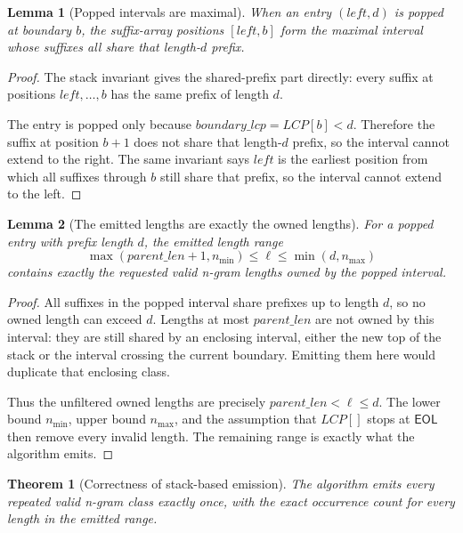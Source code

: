 \documentclass[11pt]{article}
\newtheorem{theorem}{Theorem}
\newtheorem{lemma}{Lemma}
\begin{document}
\begin{lemma}[Popped intervals are maximal]
When an entry \((\mathit{left},d)\) is popped at boundary \(b\), the
suffix-array positions \([\mathit{left},b]\) form the maximal interval whose
suffixes all share that length-\(d\) prefix.
\end{lemma}

\begin{proof}
The stack invariant gives the shared-prefix part directly: every suffix at
positions \(\mathit{left},\ldots,b\) has the same prefix of length \(d\).

The entry is popped only because \(\mathit{boundary\_lcp}=\mathit{LCP}[b]<d\).
Therefore the suffix at position \(b+1\) does not share that length-\(d\) prefix, so the
interval cannot extend to the right.  The same invariant says
\(\mathit{left}\) is the earliest position from which all suffixes through
\(b\) still share that prefix, so the interval cannot extend to the left.
\end{proof}

\begin{lemma}[The emitted lengths are exactly the owned lengths]
For a popped entry with prefix length \(d\), the emitted length range
\[
\max(\mathit{parent\_len}+1,n_{\min})\leq \ell\leq
\min(d,n_{\max})
\]
contains exactly the requested valid n-gram lengths owned by the popped
interval.
\end{lemma}

\begin{proof}
All suffixes in the popped interval share prefixes up to length \(d\), so no
owned length can exceed \(d\).  Lengths at most \(\mathit{parent\_len}\) are not owned
by this interval: they are still shared by an enclosing interval, either the new
top of the stack or the interval crossing the current boundary.  Emitting them
here would duplicate that enclosing class.

Thus the unfiltered owned lengths are precisely
\(\mathit{parent\_len}<\ell\leq d\).  The lower bound \(n_{\min}\), upper bound
\(n_{\max}\), and the assumption that \(\mathit{LCP}[]\) stops at
\(\mathsf{EOL}\) then remove every invalid length.  The remaining range is
exactly what the algorithm emits.
\end{proof}

\begin{theorem}[Correctness of stack-based emission]
The algorithm emits every repeated valid n-gram class exactly once, with the
exact occurrence count for every length in the emitted range.
\end{theorem}
\end{document}

